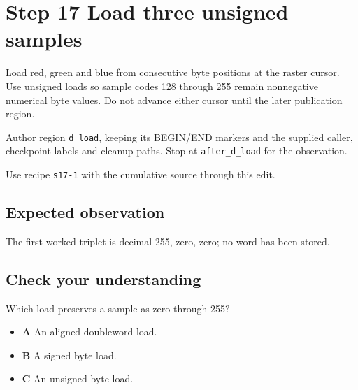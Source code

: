 \section{Step 17 Load three unsigned samples}\label{ppm-s17}

Load red, green and blue from consecutive byte positions at the raster cursor. Use unsigned loads so sample codes 128 through 255 remain nonnegative numerical byte values. Do not advance either cursor until the later publication region.

Author region \texttt{d\_load}, keeping its BEGIN/END markers and the supplied caller, checkpoint labels and cleanup paths. Stop at \texttt{after\_d\_load} for the observation.

Use recipe \texttt{s17-1} with the cumulative source through this edit.

\subsection{Expected observation}
The first worked triplet is decimal 255, zero, zero; no word has been stored.

\subsection{Check your understanding}
Which load preserves a sample as zero through 255?

\begin{itemize}
  \item \textbf{A} An aligned doubleword load.
  \item \textbf{B} A signed byte load.
  \item \textbf{C} An unsigned byte load.
\end{itemize}
